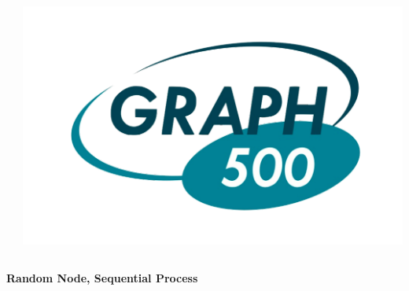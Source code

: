 \documentclass[final]{beamer} %
\begin{document}
\begin{frame}[t]
\begin{columns}[t]
\begin{column}{0.60\paperwidth}
\begin{columns}[t,totalwidth=0.60\paperwidth]
\begin{column}{0.28\paperwidth}
\begin{columns}[t,totalwidth=0.28\paperwidth]
\begin{column}{0.12\paperwidth}
							\end{column}
							\begin{column}{0.12\paperwidth}
								\begin{center} \includegraphics[width=0.12\paperwidth]{img/logo_graph500} \end{center}
							\end{column}
						\end{columns}
					\end{column}
				\end{columns}
				\begin{columns}[t,totalwidth=0.60\paperwidth]
					\begin{column}{0.28\paperwidth}
						\begin{center} \bf{Random Node, Sequential Process} \end{center}
						\begin{columns}[t,totalwidth=0.28\paperwidth]
							\begin{column}{0.12\paperwidth}

\end{column}
\end{columns}
\end{column}
\end{columns}
\end{column}
\end{columns}
\end{frame}
\end{document}
